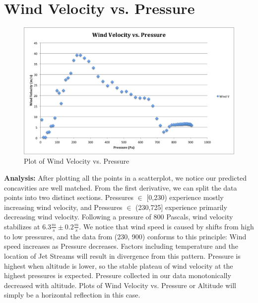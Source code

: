 \documentclass{journal}
\begin{document}
\part{Wind Velocity vs. Pressure}
\begin{figure}[H]
\centering
\includegraphics[width=5in]{IMG1CDATA.png}
\caption{Plot of Wind Velocity vs. Pressure}
\end{figure}

\begin{flushleft}
\textbf{Analysis:} After plotting all the points in a scatterplot, we notice our predicted concavities are well matched.  From the first derivative, we can split the data points into two distinct sections.  Pressures $\in$ [0,230) experience mostly increasing wind velocity, and Pressures $\in$ (230,725] experience primarily decreasing wind velocity.  Following a pressure of 800 Pascals, wind velocity stabilizes at $6.3\frac{m}{s} \pm 0.2\frac{m}{s}$.  We notice that wind speed is caused by shifts from high to low pressures, and the data from (230, 900) conforms to this principle: Wind speed increases as Pressure decreases.  Factors including temperature and the location of Jet Streams will result in divergence from this pattern.  Pressure is highest when altitude is lower, so the stable plateau of wind velocity at the highest pressures is expected.  Pressure collected in our data monotonically decreased with altitude.  Plots of Wind Velocity vs. Pressure or Altitude will simply be a horizontal reflection in this case.
\end{flushleft}
\end{document}
